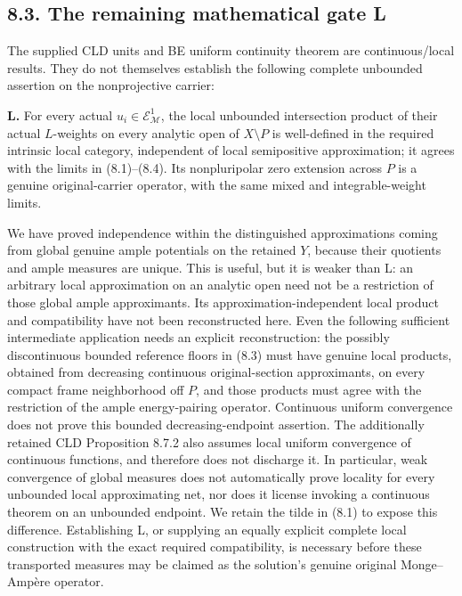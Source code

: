 \documentclass[
  10pt,
]{article}
\begin{document}
\subsection{8.3. The remaining mathematical gate
L}\label{the-remaining-mathematical-gate-l}

The supplied CLD units and BE uniform continuity theorem are
continuous/local results. They do not themselves establish the following
complete unbounded assertion on the nonprojective carrier:

\textbf{L.} For every actual \(u_i\in\mathcal E^1_{\mathcal M}\), the
local unbounded intersection product of their actual \(L\)-weights on
every analytic open of \(X\setminus P\) is well-defined in the required
intrinsic local category, independent of local semipositive
approximation; it agrees with the limits in (8.1)--(8.4). Its
nonpluripolar zero extension across \(P\) is a genuine original-carrier
operator, with the same mixed and integrable-weight limits.

We have proved independence within the distinguished approximations
coming from global genuine ample potentials on the retained \(Y\),
because their quotients and ample measures are unique. This is useful,
but it is weaker than L: an arbitrary local approximation on an analytic
open need not be a restriction of those global ample approximants. Its
approximation-independent local product and compatibility have not been
reconstructed here. Even the following sufficient intermediate
application needs an explicit reconstruction: the possibly discontinuous
bounded reference floors in (8.3) must have genuine local products,
obtained from decreasing continuous original-section approximants, on
every compact frame neighborhood off \(P\), and those products must
agree with the restriction of the ample energy-pairing operator.
Continuous uniform convergence does not prove this bounded
decreasing-endpoint assertion. The additionally retained CLD Proposition
8.7.2 also assumes local uniform convergence of continuous functions,
and therefore does not discharge it. In particular, weak convergence of
global measures does not automatically prove locality for every
unbounded local approximating net, nor does it license invoking a
continuous theorem on an unbounded endpoint. We retain the tilde in
(8.1) to expose this difference. Establishing L, or supplying an equally
explicit complete local construction with the exact required
compatibility, is necessary before these transported measures may be
claimed as the solution's genuine original Monge--Ampère operator.
\end{document}
